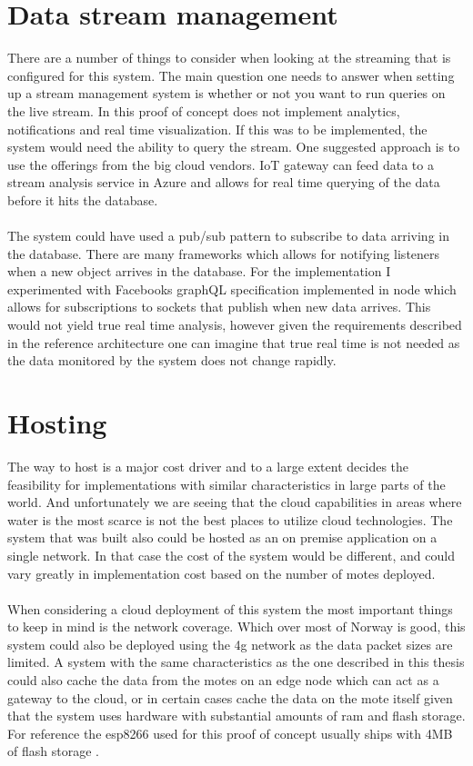 \documentclass[]{uiophd}
\begin{document}
\section{Data stream management}
There are a number of things to consider when looking at the streaming that is configured for this system. The main question one needs to answer when setting up a stream management system is whether or not you want to run queries on the live stream. In this proof of concept does not implement analytics, notifications and real time visualization. If this was to be implemented, the system would need the ability to query the stream. One suggested approach is to use the offerings from the big cloud vendors. IoT gateway can feed data to a stream analysis service in Azure and allows for real time querying of the data before it hits the database.
\\\\
The system could have used a pub/sub pattern to subscribe to data arriving in the database. There are many frameworks which allows for notifying listeners when a new object arrives in the database. For the implementation I experimented with Facebooks graphQL specification implemented in node which allows for subscriptions to sockets that publish when new data arrives. This would not yield true real time analysis, however given the requirements described in the reference architecture one can imagine that true real time is not needed as the data monitored by the system does not change rapidly.

\section{Hosting}
The way to host is a major cost driver and to a large extent decides the feasibility for implementations with similar characteristics in large parts of the world. And unfortunately we are seeing that the cloud capabilities in areas where water is the most scarce is not the best places to utilize cloud technologies. The system that was built also could be hosted as an on premise application on a single network. In that case the cost of the system would be different, and could vary greatly in implementation cost based on the number of motes deployed.
\\\\
When considering a cloud deployment of this system the most important things to keep in mind is the network coverage. Which over most of Norway is good, this system could also be deployed using the 4g network as the data packet sizes are limited. A system with the same characteristics as the one described in this thesis could also cache the data from the motes on an edge node which can act as a gateway to the cloud, or in certain cases cache the data on the mote itself given that the system uses hardware with substantial amounts of ram and flash storage. For reference the esp8266 used for this proof of concept usually ships with 4MB of flash storage \cite{espressif}.
\end{document}
